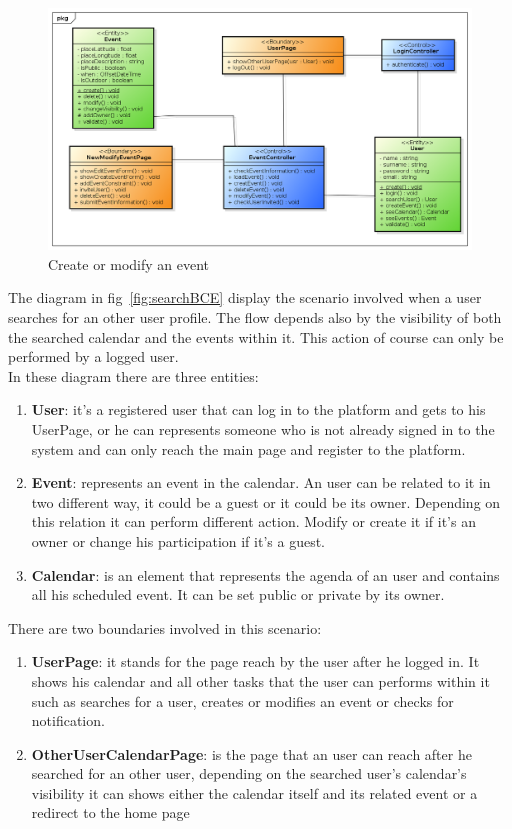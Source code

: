 \begin{center}
 \begin{figure}[H]
    \includegraphics[width=1\textwidth]{../BCEDiagram/BCE/EntityOverview/EventManagementBCE.png}
    \caption{Create or modify an event}
     \label{fig:editneweventBCE}
     \end{figure}
   \end{center}  
The diagram in fig~\ref{fig:searchBCE} display the scenario involved when a user searches for an other user profile. The flow depends also by the visibility of both the searched calendar and the events within it. This action of course can only be performed by a logged user.\\
In these diagram there are three entities:
\begin{enumerate}
\item  {\bf User}: it's a registered user that can log in to the platform and gets to his UserPage, or he can  represents someone who is not already signed in  to the system and can only reach the main page and register to the platform.
\item  {\bf Event}: represents an event in the calendar. An user can be related to it in two different way, it could be a guest or it could be its owner. Depending on this relation it can perform different action. Modify or create it if it's an owner or change his participation if it's a guest.
\item {\bf Calendar}: is an element that represents the agenda of an user and contains all his scheduled event. It can be set public or private by its owner.
\end{enumerate}
There are two boundaries involved in this scenario: \begin{enumerate}
\item {\bf UserPage}: it stands for the page reach by the user after he logged in. It shows his calendar and all other tasks that the user can performs within it such as searches for a user, creates or modifies an event or checks for notification.
 \item {\bf OtherUserCalendarPage}: is the page that an user can reach after he searched for an other user, depending on the searched user's calendar's visibility it can shows either the calendar itself and its related event or a redirect to the home page
 \end{enumerate}
